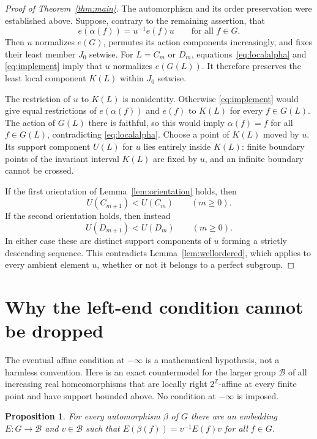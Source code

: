 \documentclass[10pt]{article}
\newtheorem{proposition}[theorem]{Proposition}
\theoremstyle{definition}
\newcommand{\Z}{\mathbb Z}
\begin{document}
\begin{proof}[Proof of Theorem~\ref{thm:main}]
The automorphism and its order preservation were established above.
Suppose, contrary to the remaining assertion, that
\begin{equation}\label{eq:implement}
 e(\alpha(f))=u^{-1}e(f)u\qquad\text{for all }f\in G.
\end{equation}
Then $u$ normalizes $e(G)$, permutes its action components
increasingly, and fixes their least member $J_0$ setwise.
For $L=C_m$ or $D_m$, equations~\eqref{eq:localalpha} and
\eqref{eq:implement} imply that $u$ normalizes $e(G(L))$.
It therefore preserves the least local component $K(L)$ within
$J_0$ setwise.

The restriction of $u$ to $K(L)$ is nonidentity. Otherwise
\eqref{eq:implement} would give equal restrictions of
$e(\alpha(f))$ and $e(f)$ to $K(L)$ for every $f\in G(L)$.
The action of $G(L)$ there is faithful, so this would imply
$\alpha(f)=f$ for all $f\in G(L)$, contradicting
\eqref{eq:localalpha}. Choose a point of $K(L)$ moved by $u$.
Its support component $U(L)$ for $u$ lies entirely inside $K(L)$:
finite boundary points of the invariant interval $K(L)$ are fixed
by $u$, and an infinite boundary cannot be crossed.

If the first orientation of Lemma~\ref{lem:orientation} holds, then
\[
 U(C_{m+1})<U(C_m)\qquad(m\ge0).
\]
If the second orientation holds, then instead
\[
 U(D_{m+1})<U(D_m)\qquad(m\ge0).
\]
In either case these are distinct support components of $u$ forming
a strictly descending sequence. This contradicts
Lemma~\ref{lem:wellordered}, which applies to every ambient element
$u$, whether or not it belongs to a perfect subgroup.
\end{proof}

\section{Why the left-end condition cannot be dropped}

The eventual affine condition at $-\infty$ is a mathematical
hypothesis, not a harmless convention. Here is an exact countermodel
for the larger group $\mathcal B$ of all increasing real homeomorphisms
that are locally right $2^{\Z}$-affine at every finite point and have
support bounded above. No condition at $-\infty$ is imposed.

\begin{proposition}\label{prop:countermodel}
For every automorphism $\beta$ of $G$ there are an embedding
$E:G\to\mathcal B$ and $v\in\mathcal B$ such that
$E(\beta(f))=v^{-1}E(f)v$ for all $f\in G$.
\end{proposition}
\end{document}
